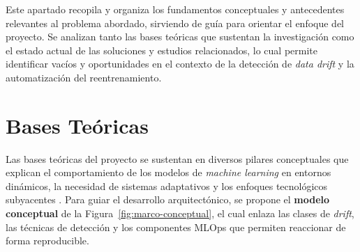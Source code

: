 
Este apartado recopila y organiza los fundamentos conceptuales y antecedentes relevantes al problema abordado, sirviendo de guía para orientar el enfoque del proyecto. Se analizan tanto las bases teóricas que sustentan la investigación como el estado actual de las soluciones y estudios relacionados, lo cual permite identificar vacíos y oportunidades en el contexto de la detección de \textit{data drift} y la automatización del reentrenamiento.

\section{Bases Teóricas}
Las bases teóricas del proyecto se sustentan en diversos pilares conceptuales que explican el comportamiento de los modelos de \textit{machine learning} en entornos dinámicos, la necesidad de sistemas adaptativos y los enfoques tecnológicos subyacentes \citep{Kodakandla2024}. Para guiar el desarrollo arquitectónico, se propone el \textbf{modelo conceptual} de la Figura~\ref{fig:marco-conceptual}, el cual enlaza las clases de \textit{drift}, las técnicas de detección y los componentes MLOps que permiten reaccionar de forma reproducible.

